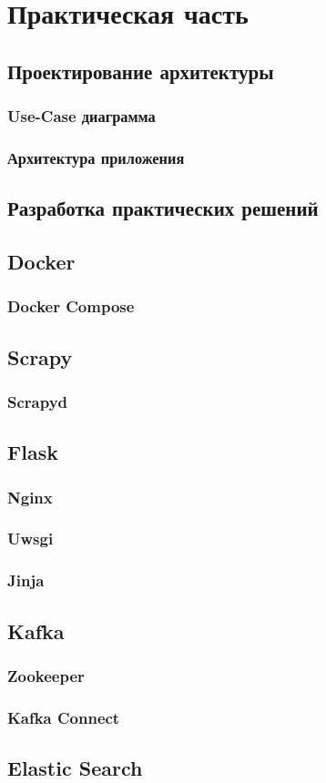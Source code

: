 \chapter{Практическая часть}
\label{cha:ch_2}

\section{Проектирование архитектуры}
\subsection{Use-Case диаграмма}
\subsection{Архитектура приложения}
\section{Разработка практических решений}
\section{Docker}
\subsection{Docker Compose}
\section{Scrapy}
\subsection{Scrapyd}
\section{Flask}
\subsection{Nginx}
\subsection{Uwsgi}
\subsection{Jinja}
\section{Kafka}
\subsection{Zookeeper}
\subsection{Kafka Connect}
\section{Elastic Search}

